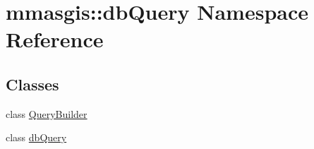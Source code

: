 \hypertarget{namespacemmasgis_1_1dbQuery}{
\section{mmasgis::dbQuery Namespace Reference}
\label{namespacemmasgis_1_1dbQuery}
}
\subsection*{Classes}
\begin{DoxyCompactItemize}
\item 
class \hyperlink{classmmasgis_1_1dbQuery_1_1QueryBuilder}{QueryBuilder}
\item 
class \hyperlink{classmmasgis_1_1dbQuery_1_1dbQuery}{dbQuery}
\end{DoxyCompactItemize}

